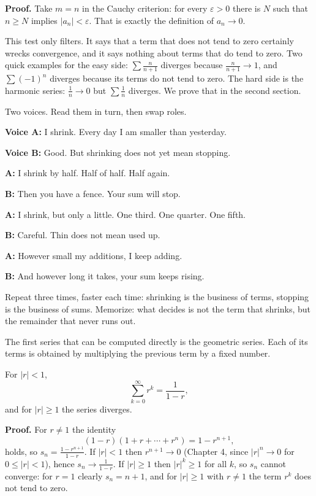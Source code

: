 \noindent\textbf{Proof.} Take $m=n$ in the Cauchy criterion: for every $\varepsilon>0$
there is $N$ such that $n \ge N$ implies $|a_n| < \varepsilon$. That is exactly the
definition of $a_n \to 0$.

This test only filters. It says that a term that does not tend to zero certainly wrecks
convergence, and it says nothing about terms that do tend to zero. Two quick examples for
the easy side: $\sum \frac{n}{n+1}$ diverges because $\frac{n}{n+1} \to 1$, and
$\sum (-1)^n$ diverges because its terms do not tend to zero. The hard side is the harmonic
series: $\frac{1}{n} \to 0$ but $\sum \frac{1}{n}$ diverges. We prove that in the second
section.

\begin{bacakeras}
Two voices. Read them in turn, then swap roles.

\textbf{Voice A:} I shrink. Every day I am smaller than yesterday.

\textbf{Voice B:} Good. But shrinking does not yet mean stopping.

\textbf{A:} I shrink by half. Half of half. Half again.

\textbf{B:} Then you have a fence. Your sum will stop.

\textbf{A:} I shrink, but only a little. One third. One quarter. One fifth.

\textbf{B:} Careful. Thin does not mean used up.

\textbf{A:} However small my additions, I keep adding.

\textbf{B:} And however long it takes, your sum keeps rising.

Repeat three times, faster each time: shrinking is the business of terms, stopping is the
business of sums. Memorize: what decides is not the term that shrinks, but the remainder
that never runs out.
\end{bacakeras}

The first series that can be computed directly is the geometric series. Each of its terms is obtained by multiplying the previous term by a fixed number.

\begin{teorema}
For $|r| < 1$,
\[
  \sum_{k=0}^{\infty} r^k = \frac{1}{1-r},
\]
and for $|r| \ge 1$ the series diverges.
\end{teorema}

\noindent\textbf{Proof.} For $r \neq 1$ the identity
\[
  (1-r)\left(1 + r + \cdots + r^n\right) = 1 - r^{n+1},
\]
holds, so $s_n = \frac{1-r^{n+1}}{1-r}$. If $|r|<1$ then $r^{n+1} \to 0$ (Chapter 4,
since $|r|^{n} \to 0$ for $0 \le |r| < 1$), hence $s_n \to \frac{1}{1-r}$. If
$|r| \ge 1$ then $|r|^k \ge 1$ for all $k$, so $s_n$ cannot converge: for $r=1$ clearly
$s_n = n+1$, and for $|r|\ge 1$ with $r\neq 1$ the term $r^k$ does not tend to zero.

